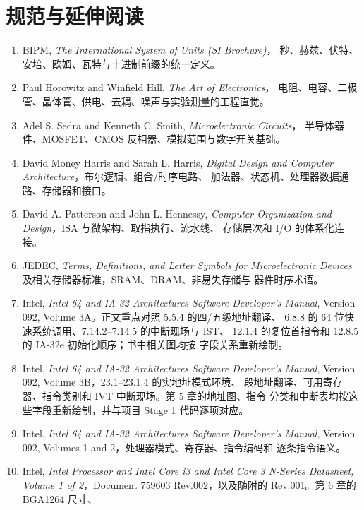 \chapter*{规范与延伸阅读}

\begin{enumerate}
  \item BIPM, \emph{The International System of Units (SI Brochure)}，
  秒、赫兹、伏特、安培、欧姆、瓦特与十进制前缀的统一定义。
  \item Paul Horowitz and Winfield Hill, \emph{The Art of Electronics}，
  电阻、电容、二极管、晶体管、供电、去耦、噪声与实验测量的工程直觉。
  \item Adel S. Sedra and Kenneth C. Smith, \emph{Microelectronic Circuits}，
  半导体器件、MOSFET、CMOS 反相器、模拟范围与数字开关基础。
  \item David Money Harris and Sarah L. Harris,
  \emph{Digital Design and Computer Architecture}，布尔逻辑、组合/时序电路、
  加法器、状态机、处理器数据通路、存储器和接口。
  \item David A. Patterson and John L. Hennessy,
  \emph{Computer Organization and Design}，ISA 与微架构、取指执行、流水线、
  存储层次和 I/O 的体系化连接。
  \item JEDEC, \emph{Terms, Definitions, and Letter Symbols for
  Microelectronic Devices} 及相关存储器标准，SRAM、DRAM、非易失存储与
  器件时序术语。
  \item Intel, \emph{Intel 64 and IA-32 Architectures Software Developer's
  Manual}, Version 092, Volume 3A。正文重点对照 5.5.4 的四/五级地址翻译、
  6.8.8 的 64 位快速系统调用、7.14.2--7.14.5 的中断现场与 IST、
  12.1.4 的复位首指令和 12.8.5 的 IA-32e 初始化顺序；书中相关图均按
  字段关系重新绘制。
  \item Intel, \emph{Intel 64 and IA-32 Architectures Software Developer's
  Manual}, Version 092, Volume 3B，23.1--23.1.4 的实地址模式环境、
  段地址翻译、可用寄存器、指令类别和 IVT 中断现场。第 5 章的地址图、指令
  分类和中断表均按这些字段重新绘制，并与项目 Stage 1 代码逐项对应。
  \item Intel, \emph{Intel 64 and IA-32 Architectures Software Developer's
  Manual}, Version 092, Volumes 1 and 2，处理器模式、寄存器、指令编码和
  逐条指令语义。
  \item Intel, \emph{Intel Processor and Intel Core i3 and Intel Core 3
  N-Series Datasheet, Volume 1 of 2}，Document 759603 Rev.002，以及随附的
   Rev.001。第 6 章的 BGA1264 尺寸、

\end{enumerate}
